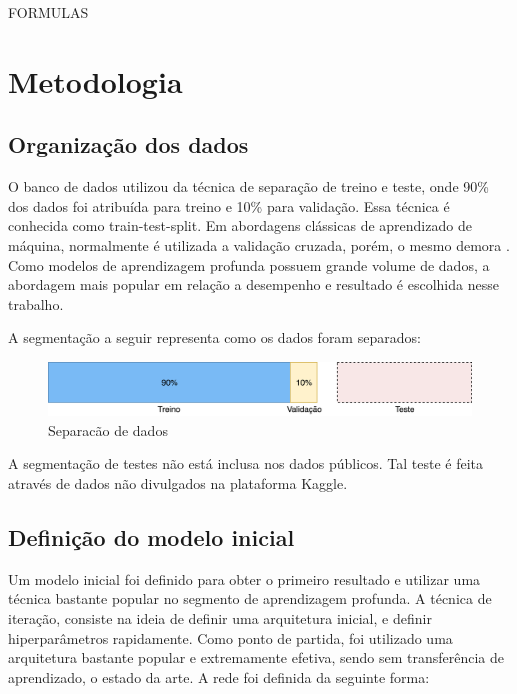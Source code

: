 \documentclass[12pt]{article}
\begin{document}
FORMULAS

\section{Metodologia}

\subsection{Organização dos dados}

O banco de dados utilizou da técnica de separação de treino e teste, onde 90\% dos dados foi atribuída para treino e 10\% para validação. Essa técnica é conhecida como train-test-split. Em abordagens clássicas de aprendizado de máquina, normalmente é utilizada a validação cruzada, porém, o mesmo demora . Como modelos de aprendizagem profunda possuem grande volume de dados, a abordagem mais popular em relação a desempenho e resultado é escolhida nesse trabalho.

A segmentação a seguir representa como os dados foram separados:

\begin{figure}[ht]
\centering
\includegraphics[width=1\textwidth]{images/datasplit.png}
\caption{Separacão de dados}
\label{fig:datasplit}
\end{figure}

A segmentação de testes não está inclusa nos dados públicos. Tal teste é feita através de dados não divulgados na plataforma Kaggle.

\subsection{Definição do modelo inicial}

Um modelo inicial foi definido para obter o primeiro resultado e utilizar uma técnica bastante popular no segmento de aprendizagem profunda. A técnica de iteração, consiste na ideia de definir uma arquitetura inicial, e definir hiperparâmetros rapidamente. Como ponto de partida, foi utilizado uma arquitetura bastante popular e extremamente efetiva, sendo sem transferência de aprendizado, o estado da arte. A rede foi definida da seguinte forma:
\end{document}
